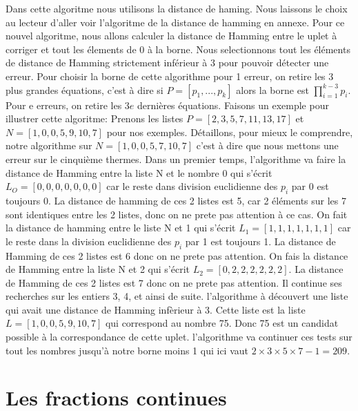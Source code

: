 \documentclass[a4paper, 11pt]{report}
\begin{document}
Dans cette algoritme nous utilisons la distance de haming. Nous laissons le choix au lecteur d'aller voir l'algoritme de la distance de hamming en annexe.\newline
Pour ce nouvel algoritme, nous allons calculer la distance de Hamming entre le uplet à corriger et tout les élements de 0 à la borne. Nous selectionnons tout les éléments de distance de Hamming strictement inférieur à 3 pour pouvoir détecter une erreur. \newline
Pour choisir la borne de cette algorithme pour 1 erreur, on retire les 3 plus grandes équations, c'est à dire si $P=[p_1, ..., p_k]$ alors la borne est $\prod_{i=1} ^{k-3} p_i$. Pour e erreurs, on retire les $3e$ dernières équations. \newline
Faisons un exemple pour illustrer cette algoritme: \newline
Prenons les listes $P=[2,3,5,7,11,13,17]$ et $N=[1,0,0,5,9,10,7]$ pour nos exemples. \newline
Détaillons, pour mieux le comprendre, notre algorithme sur $N=[1,0,0,5,7,10,7]$ c'est à dire que nous mettons une erreur sur le cinquième thermes.
Dans un premier temps, l'algorithme va faire la distance de Hamming entre la liste N et le nombre 0 qui s'écrit $L_O=[0,0,0,0,0,0,0]$ car le reste dans division euclidienne des $p_i$ par 0 est toujours 0.
La distance de hamming de ces 2 listes est 5, car 2 éléments sur les 7 sont identiques entre les 2 listes, donc on ne prete pas attention à ce cas. \newline
On fait la distance de hamming entre le liste N et 1 qui s'écrit $L_1=[1,1,1,1,1,1,1]$ car le reste dans la division euclidienne des $p_i$ par 1 est toujours 1.
La distance de Hamming de ces 2 listes est 6 donc on ne prete pas attention.
On fais la distance de Hamming entre la liste N et 2 qui s'écrit $L_2=[0,2,2,2,2,2,2]$. La distance de Hamming de ces 2 listes est 7 donc on ne prete pas attention. \newline
Il continue ses recherches sur les entiers 3, 4, et ainsi de suite. l'algorithme à découvert une liste qui avait une distance de Hamming infèrieur à 3. Cette liste est la liste $L=[1,0,0,5,9,10,7]$ qui correspond au nombre 75. Donc 75 est un candidat possible à la correspondance de cette uplet.
l'algorithme va continuer ces tests sur tout les nombres jusqu'à notre borne moins 1 qui ici vaut $2\times 3\times 5\times 7 -1=209$. \newline




\newpage
\chapter{Les fractions continues} 
\end{document}
